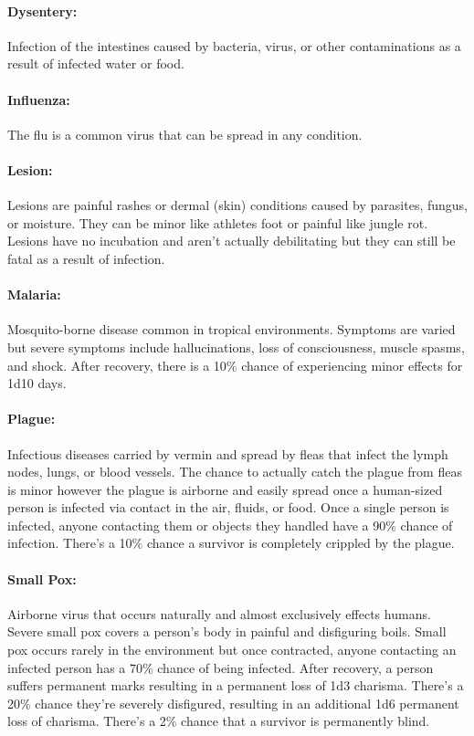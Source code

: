 \begin{multicols}{2}
\paragraph{Dysentery:} Infection of the intestines caused by bacteria, virus, or other contaminations as a result of infected water or food.  

\paragraph{Influenza:}  The flu is a common virus that can be spread in any condition.  

\paragraph{Lesion:} Lesions are painful rashes or dermal (skin) conditions caused by parasites, fungus, or moisture.  They can be minor like athletes foot or painful like jungle rot.  Lesions have no incubation and aren't actually debilitating but they can still be fatal as a result of infection.

\paragraph{Malaria:} Mosquito-borne disease common in tropical environments.  Symptoms are varied but severe symptoms include hallucinations, loss of consciousness, muscle spasms, and shock.  After recovery, there is a 10\% chance of experiencing minor effects for 1d10 days.

\paragraph{Plague:} Infectious diseases carried by vermin and spread by fleas that infect the lymph nodes, lungs, or blood vessels.  The chance to actually catch the plague from fleas is minor however the plague is airborne and easily spread once a human-sized person is infected via contact in the air, fluids, or food.  Once a single person is infected, anyone contacting them or objects they handled have a 90\% chance of infection.  There's a 10\% chance a survivor is completely crippled by the plague.

\paragraph{Small Pox:} Airborne virus that occurs naturally and almost exclusively effects humans.  Severe small pox covers a person's body in painful and disfiguring boils.  Small pox occurs rarely in the environment but once contracted, anyone contacting an infected person has a 70\% chance of being infected.  After recovery, a person suffers permanent marks resulting in a permanent loss of 1d3 charisma.  There's a 20\% chance they're severely disfigured, resulting in an additional 1d6 permanent loss of charisma.  There's a 2\% chance that a survivor is permanently blind.


\end{multicols}
